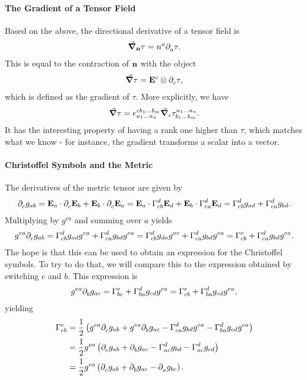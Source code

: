 \paragraph{The Gradient of a Tensor Field}
Based on the above, the directional derivative of a tensor field is
\begin{align*}
	\grad_{\vb{n}}{\tau} = n^{a}\partial^{}_{a}{\tau}.
\end{align*}
This is equal to the contraction of $\vb{n}$ with the object
\begin{align*}
	\grad{\tau} = \vb{E}^{c}\otimes\partial^{}_{c}{\tau},
\end{align*}
which is defined as the gradient of $\tau$. More explicitly, we have
\begin{align*}
	\grad{\tau} = \tensor*{e}{^{cb_{1}\dots b_{m}}_{a_{1}\dots a_{n}}}\dcov{c}{\tensor*{\tau}{^{a_{1}\dots a_{n}}_{b_{1}\dots b_{m}}}}.
\end{align*}
It has the interesting property of having a rank one higher than $\tau$, which matches what we know - for instance, the gradient transforms a scalar into a vector.

\paragraph{Christoffel Symbols and the Metric}
The derivatives of the metric tensor are given by
\begin{align*}
	\del{}{c}{g_{ab}} = \tb{a}\cdot\del{}{c}{\tb{b}} + \tb{b}\cdot\del{}{c}{\tb{a}} = \tb{a}\cdot\chris{d}{c}{b}\tb{d} + \tb{b}\cdot\chris{d}{c}{a}\tb{d} = \chris{d}{c}{b}g_{ad} + \chris{d}{c}{a}g_{bd}.
\end{align*}
Multiplying by $g^{ea}$ and summing over $a$ yields
\begin{align*}
	g^{ea}\del{}{c}{g_{ab}} = \chris{d}{c}{b}g_{ad}g^{ea} + \chris{d}{c}{a}g_{bd}g^{ea} = \chris{d}{c}{b}g_{da}g^{ae} + \chris{d}{c}{a}g_{bd}g^{ea} = \chris{e}{c}{b} + \chris{d}{c}{a}g_{bd}g^{ea}.
\end{align*}
The hope is that this can be used to obtain an expression for the Christoffel symbols. To try to do that, we will compare this to the expression obtained by switching $c$ and $b$. This expression is
\begin{align*}
	g^{ea}\del{}{b}{g_{ac}} = \chris{e}{b}{c} + \chris{d}{b}{a}g_{cd}g^{ea} = \chris{e}{c}{b} + \chris{d}{b}{a}g_{cd}g^{ea},
\end{align*}
yielding
\begin{align*}
	\chris{e}{c}{b} &= \frac{1}{2}\left(g^{ea}\del{}{c}{g_{ab}} + g^{ea}\del{}{b}{g_{ac}} - \chris{d}{c}{a}g_{bd}g^{ea} - \chris{d}{b}{a}g_{cd}g^{ea}\right) \\
	                &= \frac{1}{2}g^{ea}\left(\del{}{c}{g_{ab}} + \del{}{b}{g_{ac}} - \chris{d}{a}{c}g_{bd} - \chris{d}{a}{c}g_{cd}\right) \\
	                &= \frac{1}{2}g^{ea}\left(\del{}{c}{g_{ab}} + \del{}{b}{g_{ac}} - \del{}{a}{g_{bc}}\right).
\end{align*}

